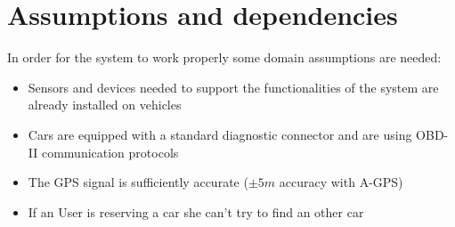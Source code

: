 \section{Assumptions and dependencies}
In order for the system to work properly some domain assumptions are needed:
\begin{itemize}
	\item{Sensors and devices needed to support the functionalities of the system are already installed on vehicles}
	\item{Cars are equipped with a standard diagnostic connector and are using OBD-II communication protocols}
	\item{The GPS signal is sufficiently accurate ($\pm5m$ accuracy with A-GPS)}
	\item{If an User is reserving a car she can't try to find an other car}
\end{itemize}

